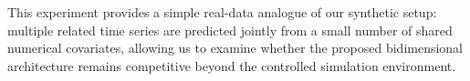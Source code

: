 \documentclass{article}
\begin{document}
This experiment provides a simple real-data analogue of our synthetic setup: multiple related time series are predicted jointly from a small number of shared numerical covariates, allowing us to examine whether the proposed bidimensional architecture remains competitive beyond the controlled simulation environment.

\end{document}
